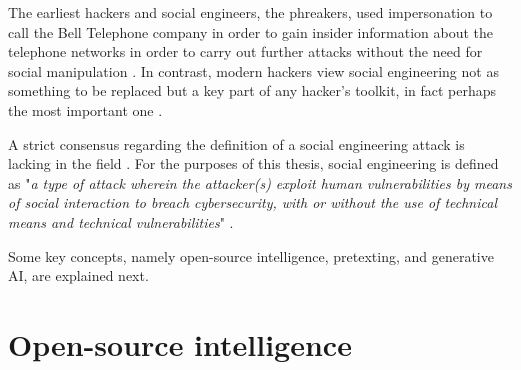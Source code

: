 The earliest hackers and social engineers, the phreakers, used impersonation to call the Bell Telephone company in order to gain insider information about the telephone networks in order to carry out further attacks without the need for social manipulation \citep{hatfieldSocialEngineeringCybersecurity2018a}. In contrast, modern hackers view social engineering not as something to be replaced but a key part of any hacker's toolkit, in fact perhaps the most important one \citep{mitnickArtDeceptionControlling2003}.



A strict consensus regarding the definition of a social engineering attack is lacking in the field  \citep{hatfieldSocialEngineeringCybersecurity2018a}. For the purposes of this thesis, social engineering is defined as "\textit{a type of attack wherein the attacker(s) exploit human vulnerabilities by means of social interaction to breach cybersecurity, with or without the use of technical means and technical vulnerabilities}" \citep{wangDefiningSocialEngineering2020}.

Some key concepts, namely open-source intelligence, pretexting, and generative AI, are explained next.









\section{Open-source intelligence}
\begin{comment}

    - OSINT, sometimes written as OS-INT?
    - Data from publicly available resources
        - Company website
        - Social networking sites
        - Sites like archive.org and Google archives
        - Observing people in real life
    - Does not include calling the company and asking for information or any other forms of engagement
    - How modern AI augments OSINT gathering is analyzed in the last chapter
        - Exploration of how AI tools and techniques used for the automation and enhancement of OSINT processes
    - Stress the importance of OSINT within SE
    - Ethical considerations when it comes to OSINT
    - Some case studies highlighting the use of OSINT in real-world social engineering incidents?
    - Countermeasures will also be covered later
        - Strategies for companies to mitigate the risks associated with OSINT-based attacks
        - Integration of AI algorithms for analyzing and extracting valuable insights from OSINT data
        - Impact of AI-powered intelligence gathering of SE attacks
        
\end{comment}

